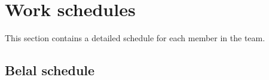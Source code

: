 \documentclass[a4paper, 12pt, english]{book}
\begin{document}
\section{Work schedules}

This section contains a detailed schedule for each member in the team.

\subsection{Belal schedule}
\end{document}
